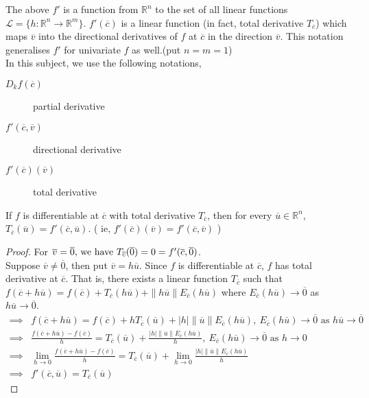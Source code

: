 \begin{note}
	The above $f'$ is a function from $\mathbb{R}^n$ to the set of all linear functions \( \mathscr{L} = \{ h : \mathbb{R}^n \to \mathbb{R}^m\} \). $f'(\overline{c})$ is a linear function (in fact, total derivative $T_{\overline{c}}$) which maps $\overline{v}$ into the directional derivatives of $f$ at $\overline{c}$ in the direction $\overline{v}$. This notation generalises $f'$ for univariate $f$ as well.(put $n=m=1$)\\

	In this subject, we use the following notations,
	\begin{description}
		\item[$D_kf(\overline{c})$] partial derivative
		\item[$f'(\overline{c},\overline{v})$] directional derivative
		\item[$f'(\overline{c})(\overline{v})$] total derivative
	\end{description}
\end{note}

\begin{theorem}
	If $f$ is differentiable at $\overline{c}$ with total derivative $T_{\overline{c}}$, then for every $\overline{u} \in \mathbb{R}^n$, $T_{\overline{c}}(\overline{u}) = f'(\overline{c},\overline{u})$. ( ie, \( f'(\overline{c})(\overline{v}) = f'(\overline{c},\overline{v}) \) )
\end{theorem}
\begin{proof}
	For \( \overline{v} = \overline{0}$, we have $T_{\overline{c}}(\overline{0}) = 0 = f'(\overline{c},\overline{0}) \).\\

	Suppose \( \overline{v} \ne \overline{0} \), then put \( \overline{v} = h\overline{u} \). Since $f$ is differentiable at $\overline{c}$, $f$ has total derivative at $\overline{c}$. That is, there exists a linear function $T_{\overline{c}}$ such that \( f(\overline{c}+h\overline{u}) = f(\overline{c}) + T_{\overline{c}}(h\overline{u}) + \|h\overline{u}\|E_{\overline{c}} (h\overline{u}) \) where $E_{\overline{c}}(h\overline{u}) \to \overline{0}$ as $h\overline{u} \to \overline{0}$.
	\begin{align*}
		\implies  & f(\overline{c}+h\overline{u}) = f(\overline{c}) + hT_{\overline{c}}(\overline{u}) + |h|\|\overline{u}\|E_{\overline{c}} (h\overline{u}),\ E_{\overline{c}}(h\overline{u}) \to \overline{0} \text{ as } h\overline{u} \to \overline{0} \\
		\implies  & \frac{f(\overline{c}+h\overline{u}) - f(\overline{c})}{h} = T_{\overline{c}}(\overline{u}) + \frac{|h|\|\overline{u}\|E_{\overline{c}}(h\overline{u})}{h},\  E_{\overline{c}}(h\overline{u}) \to \overline{0} \text{ as } h \to 0 \\
		\implies  & \lim_{h \to 0} \frac{f(\overline{c}+h\overline{u}) - f(\overline{c})}{h} = T_{\overline{c}}(\overline{u}) + \lim_{h \to 0} \frac{|h|\|\overline{u}\|E_{\overline{c}}(h\overline{u})}{h} \\
		\implies & f'(\overline{c},\overline{u}) = T_{\overline{c}}(\overline{u})
	\end{align*}
\end{proof}


